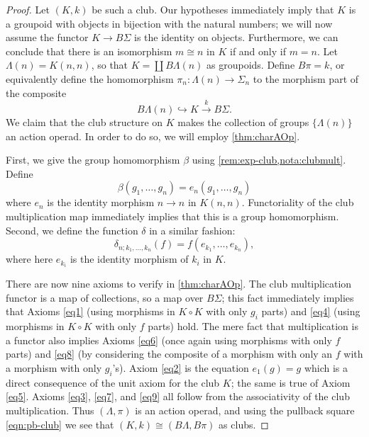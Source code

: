 \begin{proof}
Let $(K,k)$ be such a club. Our hypotheses immediately imply that $K$ is a groupoid with objects in bijection with the natural numbers; we will now assume the functor $K \rightarrow B\Sigma$ is the identity on objects. Furthermore, we can conclude that there is an isomorphism $m \cong n$ in $K$ if and only if $m = n$. Let $\Lambda(n) = K(n,n)$, so that $K = \coprod B\Lambda(n)$ as groupoids. Define $B\pi = k$, or equivalently define the homomorphism $\pi_{n} \colon \Lambda(n) \rightarrow \Sigma_{n}$ to the morphism part of the composite
\[
B\Lambda(n) \hookrightarrow K \stackrel{k}{\to} B\Sigma.
\]
 We claim that the club structure on $K$ makes the collection of groups $\{ \Lambda(n) \}$ an action operad. In order to do so, we will employ \cref{thm:charAOp}.

First, we give the group homomorphism $\beta$ using \cref{rem:exp-club,nota:clubmult}. Define
  \[
    \beta(g_{1}, \ldots, g_{n}) = e_{n}(g_{1}, \ldots, g_{n})
  \]
where $e_{n}$ is the identity morphism $n \rightarrow n$ in $K(n,n)$. Functoriality of the club multiplication map immediately implies that this is a group homomorphism. Second, we define the function $\delta$ in a similar fashion:
  \[
    \delta_{n; k_{1}, \ldots, k_{n}}(f) = f(e_{k_1}, \ldots, e_{k_n}),
  \]
where here $e_{k_i}$ is the identity morphism of $k_{i}$ in $K$.

There are now nine axioms to verify in \cref{thm:charAOp}. The club multiplication functor is a map of collections, so a map over $B\Sigma$; this fact immediately implies that Axioms \eqref{eq1} (using morphisms in $K \circ K$ with only $g_{i}$ parts) and \eqref{eq4} (using morphisms in $K \circ K$ with only $f$ parts) hold. The mere fact that multiplication is a functor also implies Axioms \eqref{eq6} (once again using morphisms with only $f$ parts) and \eqref{eq8} (by considering the composite of a morphism with only an $f$ with a morphism with only $g_{i}$'s). Axiom \eqref{eq2} is the equation $e_{1}(g) = g$ which is a direct consequence of the unit axiom for the club $K$; the same is true of Axiom \eqref{eq5}. Axioms \eqref{eq3}, \eqref{eq7},  and \eqref{eq9} all follow from the associativity of the club multiplication. Thus $(\Lambda, \pi)$ is an action operad, and using the pullback square \cref{eqn:pb-club} we see that $(K,k) \cong (B\Lambda, B\pi)$ as clubs.


\end{proof}
